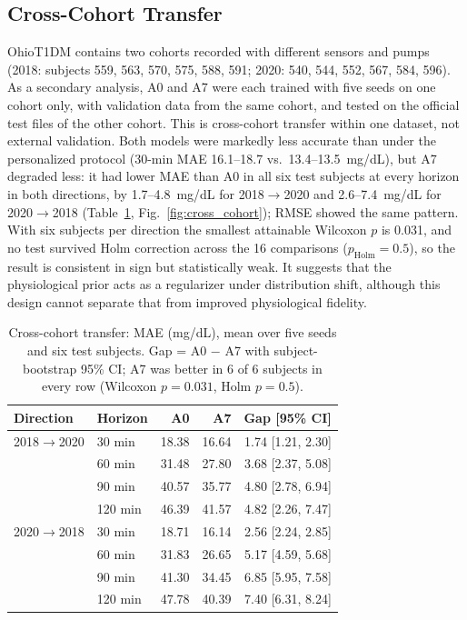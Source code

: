 \documentclass[journal]{IEEEtran}
\begin{document}
\subsection{Cross-Cohort Transfer}
\label{sec:cross_cohort}
OhioT1DM contains two cohorts recorded with different sensors and pumps (2018: subjects 559, 563, 570, 575, 588, 591; 2020: 540, 544, 552, 567, 584, 596). As a secondary analysis, A0 and A7 were each trained with five seeds on one cohort only, with validation data from the same cohort, and tested on the official test files of the other cohort. This is cross-cohort transfer within one dataset, not external validation. Both models were markedly less accurate than under the personalized protocol (30-min MAE 16.1--18.7 vs.\ 13.4--13.5~mg/dL), but A7 degraded less: it had lower MAE than A0 in all six test subjects at every horizon in both directions, by 1.7--4.8~mg/dL for 2018$\rightarrow$2020 and 2.6--7.4~mg/dL for 2020$\rightarrow$2018 (Table~\ref{tab:cross_cohort}, Fig.~\ref{fig:cross_cohort}); RMSE showed the same pattern. With six subjects per direction the smallest attainable Wilcoxon $p$ is 0.031, and no test survived Holm correction across the 16 comparisons ($p_{\text{Holm}} = 0.5$), so the result is consistent in sign but statistically weak. It suggests that the physiological prior acts as a regularizer under distribution shift, although this design cannot separate that from improved physiological fidelity.

\begin{table}[t]
\centering
\caption{Cross-cohort transfer: MAE (mg/dL), mean over five seeds and six test subjects. Gap = A0 $-$ A7 with subject-bootstrap 95\% CI; A7 was better in 6 of 6 subjects in every row (Wilcoxon $p = 0.031$, Holm $p = 0.5$).}
\label{tab:cross_cohort}
\footnotesize
\begin{tabular}{llrrr}
\toprule
Direction & Horizon & A0 & A7 & Gap [95\% CI] \\
\midrule
2018$\rightarrow$2020 & 30 min & 18.38 & 16.64 & 1.74 [1.21, 2.30] \\
 & 60 min & 31.48 & 27.80 & 3.68 [2.37, 5.08] \\
 & 90 min & 40.57 & 35.77 & 4.80 [2.78, 6.94] \\
 & 120 min & 46.39 & 41.57 & 4.82 [2.26, 7.47] \\
\midrule
2020$\rightarrow$2018 & 30 min & 18.71 & 16.14 & 2.56 [2.24, 2.85] \\
 & 60 min & 31.83 & 26.65 & 5.17 [4.59, 5.68] \\
 & 90 min & 41.30 & 34.45 & 6.85 [5.95, 7.58] \\
 & 120 min & 47.78 & 40.39 & 7.40 [6.31, 8.24] \\
\bottomrule
\end{tabular}
\end{table}
\end{document}
